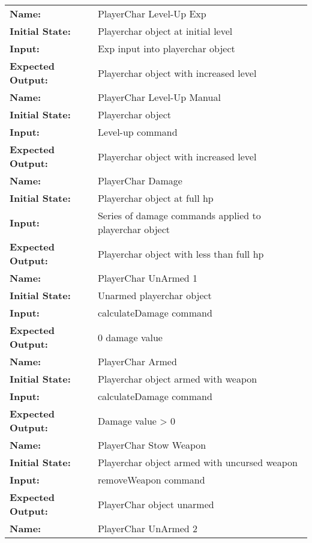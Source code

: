 \documentclass[12pt, titlepage]{article}
\begin{document}
\begin{center}
\begin{longtable}{ l | p{10cm} }
				\hline
				\rule{0pt}{2em}\textbf{Name:} & PlayerChar Level-Up Exp\\
				\textbf{Initial State:} & Playerchar object at initial level\\
				\textbf{Input:} & Exp input into playerchar object\\
				\textbf{Expected Output:} & Playerchar object with increased level\\[1em]
				\hline
				\rule{0pt}{2em}\textbf{Name:} & PlayerChar Level-Up Manual\\
				\textbf{Initial State:} & Playerchar object\\
				\textbf{Input:} & Level-up command\\
				\textbf{Expected Output:} & Playerchar object with increased level\\[1em]
				\hline
				\rule{0pt}{2em}\textbf{Name:} & PlayerChar Damage\\
				\textbf{Initial State:} & Playerchar object at full hp\\
				\textbf{Input:} & Series of damage commands applied to playerchar object\\
				\textbf{Expected Output:} & Playerchar object with less than full hp\\[1em]
				\hline
				\rule{0pt}{2em}\textbf{Name:} & PlayerChar UnArmed 1\\
				\textbf{Initial State:} & Unarmed playerchar object\\
				\textbf{Input:} & calculateDamage command\\
				\textbf{Expected Output:} & 0 damage value\\[1em]
				\hline
				\rule{0pt}{2em}\textbf{Name:} & PlayerChar Armed\\
				\textbf{Initial State:} & Playerchar object armed with weapon\\
				\textbf{Input:} & calculateDamage command\\
				\textbf{Expected Output:} & Damage value > 0\\[1em]
				\hline
				\rule{0pt}{2em}\textbf{Name:} & PlayerChar Stow Weapon\\
				\textbf{Initial State:} & Playerchar object armed with uncursed weapon\\
				\textbf{Input:} & removeWeapon command\\
				\textbf{Expected Output:} & PlayerChar object unarmed\\[1em]
				\hline
				\rule{0pt}{2em}\textbf{Name:} & PlayerChar UnArmed 2\\

\end{longtable}
\end{center}
\end{document}
